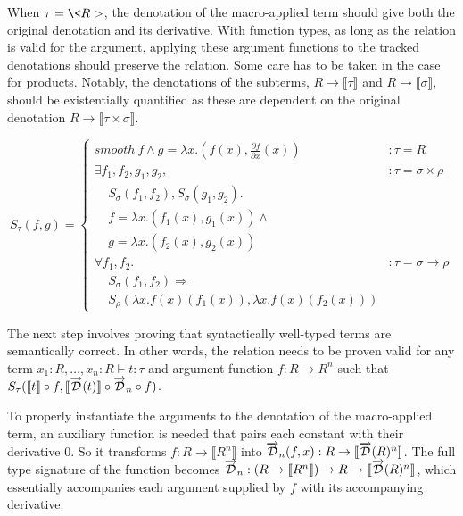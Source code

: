   When $\tau = \<R>$, the denotation of the macro-applied term should give both the original denotation and its derivative.
  With function types, as long as the relation is valid for the argument, applying these argument functions to the tracked denotations should preserve the relation.
  Some care has to be taken in the case for products.
  Notably, the denotations of the subterms, $R \rightarrow \llbracket \tau \rrbracket$ and $R \rightarrow \llbracket \sigma \rrbracket$, should be existentially quantified as these are dependent on the original denotation $R \rightarrow \llbracket \tau \times \sigma \rrbracket$.

  \begin{equation}
    S_\tau(f, g) =
      \left\{
        \begin{array}{ll}
          smooth\ f \wedge
            g = \lambda x. (f(x), \frac{\partial f}{\partial x}(x))
            & : \tau = R \\
          \exists f_1, f_2, g_1, g_2,
            & : \tau = \sigma \times \rho \\
            \;\;\;\;S_\sigma(f_1, f_2), S_\sigma(g_1, g_2). \\
            \;\;\;\;f = \lambda x. (f_1(x), g_1(x)) \wedge \\
            \;\;\;\;g = \lambda x. (f_2(x), g_2(x)) \\
          \forall f_1, f_2.
            & : \tau = \sigma \rightarrow \rho \\
            \;\;\;\;S_\sigma(f_1, f_2) \Rightarrow \\
            \;\;\;\;S_\rho(\lambda x. f(x)(f_1(x)),\lambda x. f(x)(f_2(x)))
        \end{array}
      \right.
  \label{eqn:lr_base}
  \end{equation}

  The next step involves proving that syntactically well-typed terms are semantically correct.
  In other words, the relation needs to be proven valid for any term $x_1 : R, \dots, x_n : R \vdash t : \tau$ and argument function $f : R \rightarrow R^n$ such that $S_\tau(\llbracket t \rrbracket \circ f, \llbracket \overrightarrow{\mathcal{D}}(t) \rrbracket \circ \overrightarrow{\mathcal{D}}_n \circ f)$.

  To properly instantiate the arguments to the denotation of the macro-applied term, an auxiliary function is needed that pairs each constant with their derivative $0$. So it transforms $f : R \rightarrow \llbracket R^n \rrbracket$ into $\overrightarrow{\mathcal{D}}_n(f, x) : R \rightarrow \llbracket \overrightarrow{\mathcal{D}}(R)^n \rrbracket$.
  The full type signature of the function becomes $\overrightarrow{\mathcal{D}}_n : (R \rightarrow \llbracket R^n \rrbracket) \rightarrow R \rightarrow \llbracket \overrightarrow{\mathcal{D}}(R)^n \rrbracket$, which essentially accompanies each argument supplied by $f$ with its accompanying derivative.

